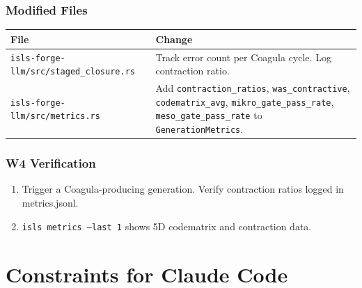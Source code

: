 \documentclass[11pt,a4paper]{article}
\begin{document}
\subsubsection{Modified Files}

\begin{longtable}{lp{10cm}}
\toprule
\textbf{File} & \textbf{Change} \\
\midrule
\texttt{isls-forge-llm/src/staged\_closure.rs}
  & Track error count per Coagula cycle. Log contraction 
    ratio. \\
\texttt{isls-forge-llm/src/metrics.rs}
  & Add \texttt{contraction\_ratios}, 
    \texttt{was\_contractive}, \texttt{codematrix\_avg}, 
    \texttt{mikro\_gate\_pass\_rate}, 
    \texttt{meso\_gate\_pass\_rate} to 
    \texttt{GenerationMetrics}. \\
\bottomrule
\end{longtable}

\subsubsection{W4 Verification}

\begin{enumerate}[nosep]
\item Trigger a Coagula-producing generation. Verify 
      contraction ratios logged in metrics.jsonl.
\item \texttt{isls metrics --last 1} shows 5D codematrix 
      and contraction data.
\end{enumerate}


\section{Constraints for Claude Code}
\end{document}

